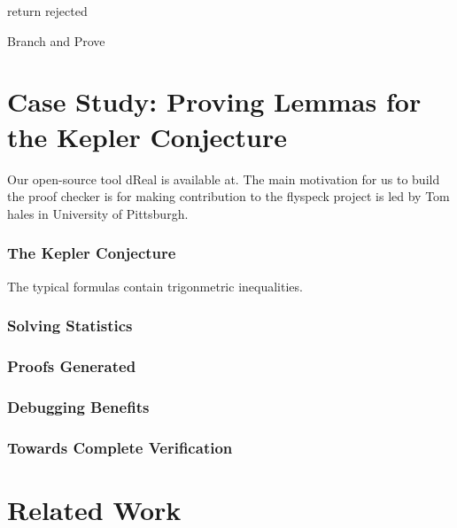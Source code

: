 \documentclass[envcountsect]{llncs}
\begin{document}
\begin{algorithm}
\BlankLine
{}
return {\sf rejected}\;
\caption{Branch and Prove\label{algo1}}
\end{algorithm}


\section{Case Study: Proving Lemmas for the Kepler Conjecture}

Our open-source tool dReal is available at. The main motivation for us to build
the proof checker is for making contribution to the flyspeck project is led
by Tom hales in University of Pittsburgh. 

\subsubsection{The Kepler Conjecture}

The typical formulas contain trigonmetric inequalities.

\subsubsection{Solving Statistics}



\subsubsection{Proofs Generated}



\subsubsection{Debugging Benefits}


\subsubsection{Towards Complete Verification}




\section{Related Work}
\end{document}
